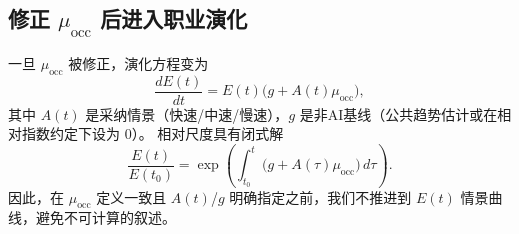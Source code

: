 \subsection{修正 $\mu_{\mathrm{occ}}$ 后进入职业演化}

一旦 $\mu_{\mathrm{occ}}$ 被修正，演化方程变为
\begin{equation}
    \frac{dE(t)}{dt}=E(t)\big(g + A(t)\mu_{\mathrm{occ}}\big),
\end{equation}
其中 $A(t)$ 是采纳情景（快速/中速/慢速），$g$ 是非AI基线（公共趋势估计或在相对指数约定下设为 $0$）。
相对尺度具有闭式解
\begin{equation}
    \frac{E(t)}{E(t_0)}=\exp\left(\int_{t_0}^{t}\big(g+A(\tau)\mu_{\mathrm{occ}}\big)\,d\tau\right).
\end{equation}
因此，在 $\mu_{\mathrm{occ}}$ 定义一致且 $A(t)$/$g$ 明确指定之前，我们不推进到 $E(t)$ 情景曲线，避免不可计算的叙述。
